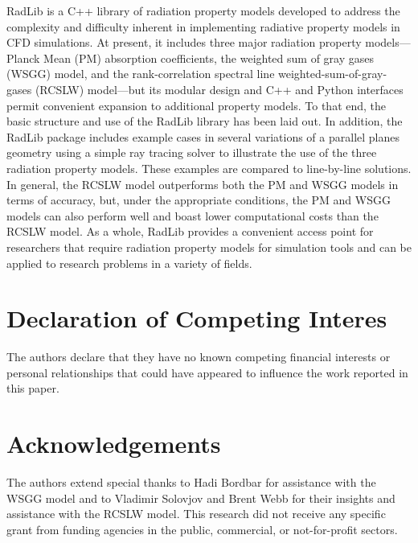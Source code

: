 \documentclass[preprint,12pt]{elsarticle}
\begin{document}
RadLib is a C++ library of radiation property models developed to address the complexity and difficulty inherent in implementing radiative property models in CFD simulations. At present, it includes three major radiation property models---Planck Mean (PM) absorption coefficients, the weighted sum of gray gases (WSGG) model, and the rank-correlation spectral line weighted-sum-of-gray-gases (RCSLW) model---but its modular design and C++ and Python interfaces permit convenient expansion to additional property models. To that end, the basic structure and use of the RadLib library has been laid out. In addition, the RadLib package includes example cases in several variations of a parallel planes geometry using a simple ray tracing solver to illustrate the use of the three radiation property models. These examples are compared to line-by-line solutions. In general, the RCSLW model outperforms both the PM and WSGG models in terms of accuracy, but, under the appropriate conditions, the PM and WSGG models can also perform well and boast lower computational costs than the RCSLW model. As a whole, RadLib provides a convenient access point for researchers that require radiation property models for simulation tools and can be applied to research problems in a variety of fields. 


\section{Declaration of Competing Interes} \label{s:coi}

The authors declare that they have no known competing financial interests or personal relationships that could have appeared to influence the work reported in this paper.



\section*{Acknowledgements} \label{sec:acknowledgements}

The authors extend special thanks to Hadi Bordbar for assistance with the WSGG model and to Vladimir Solovjov and Brent Webb for their insights and assistance with the RCSLW model. 
This research did not receive any specific grant from funding agencies in the public, commercial, or
not-for-profit sectors.
\end{document}
